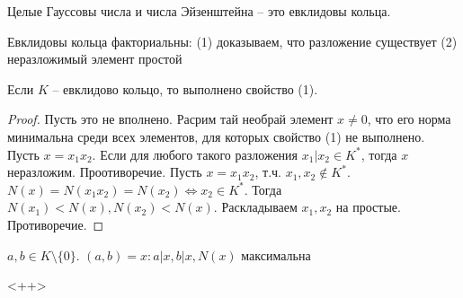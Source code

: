 \documentclass[document.tex]{subfiles}
\begin{document}
\begin{statement}
	Целые Гауссовы числа и числа Эйзенштейна -- это евклидовы кольца.
\end{statement}

\begin{theorem}
	Евклидовы кольца факториальны:
	(1) доказываем, что разложение существует
	(2) неразложимый элемент простой
\end{theorem}

\begin{statement}
	Если $K$ -- евклидово кольцо, то выполнено свойство (1).
\end{statement}

\begin{proof}
	Пусть это не вполнено. Расрим тай необрай элемент $x \neq 0$, что его норма минимальна среди всех элементов, для которых свойство (1) не выполнено. Пусть $x = x_1 x_2$. Если для любого такого разложения $x_1 | x_2 \in K^*$, тогда $x$ неразложим. Проотиворечие. Пусть $x = x_1 x_2$, т.ч. $x_1, x_2 \not \in K^*$. $N(x) = N(x_1 x_2) = N(x_2) \Leftrightarrow x_2 \in K^*$. Тогда $N(x_1) < N(x), N(x_2) < N(x)$. Раскладываем $x_1, x_2$ на простые. Противоречие.
\end{proof}

\begin{definition}
	$a, b \in K \setminus \{0\}$. $(a, b) = x : a | x, b | x, N(x)$ максимальна
\end{definition}<++>
\end{document}
